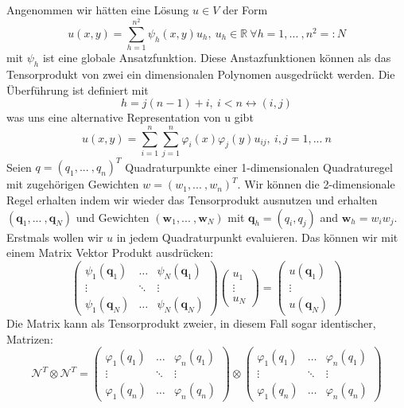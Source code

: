 Angenommen wir hätten eine Lösung $u \in V$ der Form
\begin{equation}
u(x,y)=\sum_{h=1}^{n^2} \psi_h (x,y) u_h,\ u_h \in \mathbb{R} \ \forall h =1,...\ ,n^2=:N
\end{equation}
mit $\psi_h$ ist eine globale Ansatzfunktion. Diese Anstazfunktionen können als das Tensorprodukt von zwei ein dimensionalen Polynomen ausgedrückt werden. Die Überführung ist definiert mit
\begin{equation}
h=j(n-1)+i,\ i<n \leftrightarrow (i,j)
\end{equation}
was uns eine alternative Representation von u gibt
\begin{equation}
u(x,y)=\sum_{i=1}^n \sum_{j=1}^n \varphi_i(x) \varphi_j(y) u_{ij}, \ i,j =1,...\ n
\end{equation}
Seien $q=(q_1,...\ ,q_n)^T$ Quadraturpunkte einer 1-dimensionalen Quadraturegel mit zugehörigen Gewichten $w=(w_1,...\ ,w_n)^T$. Wir können die 2-dimensionale Regel erhalten indem wir wieder das Tensorprodukt ausnutzen und erhalten  $(\bm{q}_1,...\ ,\bm{q}_N)$ und Gewichten $(\bm{w}_1,...\ ,\bm{w}_N)$ mit $\bm{q}_h=(q_i,q_j)$ and $\bm{w}_h=w_i w_j$.\\
Erstmals wollen wir $u$ in jedem Quadraturpunkt evaluieren. Das können wir mit einem Matrix Vektor Produkt ausdrücken:
\begin{equation}
\begin{pmatrix}
\psi_1(\bm{q}_1) & \hdots & \psi_N(\bm{q}_1) \\
\vdots & \ddots & \vdots \\
\psi_1(\bm{q}_N) & \hdots & \psi_N(\bm{q}_N)
\end{pmatrix}
\begin{pmatrix}
u_1 \\
\vdots \\
u_N
\end{pmatrix}
=
\begin{pmatrix}
u(\bm{q}_1) \\
\vdots \\
u(\bm{q}_N)
\end{pmatrix}
\end{equation}
Die Matrix kann als Tensorprodukt zweier, in diesem Fall sogar identischer, Matrizen:
\begin{equation}
\mathcal{N}^T \otimes \mathcal{N}^T =
\begin{pmatrix}
\varphi_1(q_1) & \hdots & \varphi_n(q_1) \\
\vdots & \ddots & \vdots \\
\varphi_1(q_n) & \hdots & \varphi_n(q_n)
\end{pmatrix}
\otimes
\begin{pmatrix}
\varphi_1(q_1) & \hdots & \varphi_n(q_1) \\
\vdots & \ddots & \vdots \\
\varphi_1(q_n) & \hdots & \varphi_n(q_n)
\end{pmatrix}
\end{equation}
